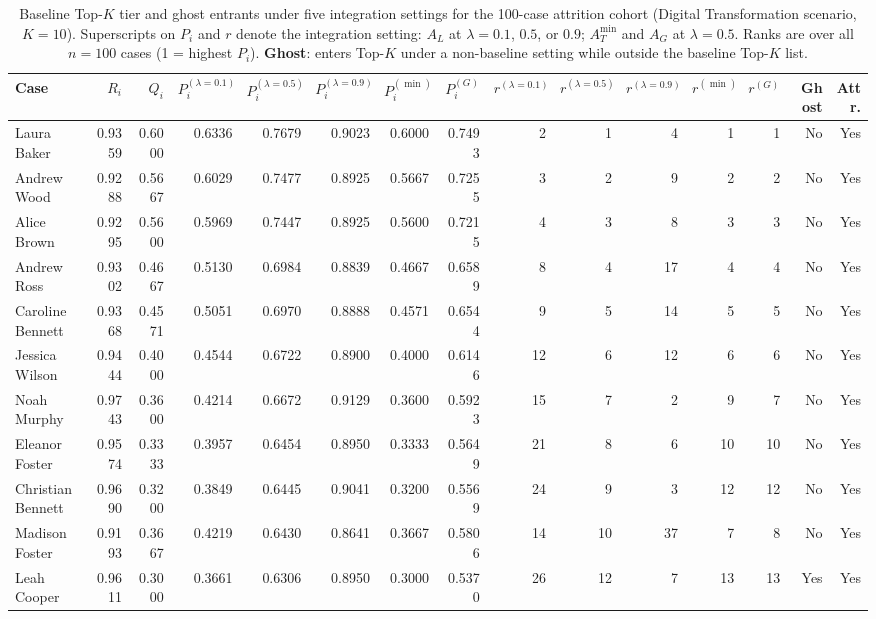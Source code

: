 \documentclass[mathematics,article,submit,moreauthors]{Definitions/mdpi}
\begin{document}
\begin{table}[t]
\centering
\scriptsize
\caption{Baseline Top-$K$ tier and ghost entrants under five integration settings for the 100-case attrition cohort (Digital Transformation scenario, $K = 10$). Superscripts on $P_i$ and $r$ denote the integration setting: $A_L$ at $\lambda = 0.1$, $0.5$, or $0.9$; $A_T^{\min}$ and $A_G$ at $\lambda = 0.5$. Ranks are over all $n = 100$ cases (1 = highest $P_i$). \textbf{Ghost}: enters Top-$K$ under a non-baseline setting while outside the baseline Top-$K$ list.}
\label{tab:real_example}
\setlength{\tabcolsep}{2pt}
\begin{tabular}{lrrrrrrrrrrrrrr}
\toprule
\textbf{Case} & $R_i$ & $Q_i$ & $P_i^{(\lambda=0.1)}$ & $P_i^{(\lambda=0.5)}$ & $P_i^{(\lambda=0.9)}$ & $P_i^{(\min)}$ & $P_i^{(G)}$ & $r^{(\lambda=0.1)}$ & $r^{(\lambda=0.5)}$ & $r^{(\lambda=0.9)}$ & $r^{(\min)}$ & $r^{(G)}$ & \textbf{Ghost} & \textbf{Attr.} \\
\midrule
Laura Baker & 0.9359 & 0.6000 & 0.6336 & 0.7679 & 0.9023 & 0.6000 & 0.7493 & 2 & 1 & 4 & 1 & 1 & No & Yes \\
Andrew Wood & 0.9288 & 0.5667 & 0.6029 & 0.7477 & 0.8925 & 0.5667 & 0.7255 & 3 & 2 & 9 & 2 & 2 & No & Yes \\
Alice Brown & 0.9295 & 0.5600 & 0.5969 & 0.7447 & 0.8925 & 0.5600 & 0.7215 & 4 & 3 & 8 & 3 & 3 & No & Yes \\
Andrew Ross & 0.9302 & 0.4667 & 0.5130 & 0.6984 & 0.8839 & 0.4667 & 0.6589 & 8 & 4 & 17 & 4 & 4 & No & Yes \\
Caroline Bennett & 0.9368 & 0.4571 & 0.5051 & 0.6970 & 0.8888 & 0.4571 & 0.6544 & 9 & 5 & 14 & 5 & 5 & No & Yes \\
Jessica Wilson & 0.9444 & 0.4000 & 0.4544 & 0.6722 & 0.8900 & 0.4000 & 0.6146 & 12 & 6 & 12 & 6 & 6 & No & Yes \\
Noah Murphy & 0.9743 & 0.3600 & 0.4214 & 0.6672 & 0.9129 & 0.3600 & 0.5923 & 15 & 7 & 2 & 9 & 7 & No & Yes \\
Eleanor Foster & 0.9574 & 0.3333 & 0.3957 & 0.6454 & 0.8950 & 0.3333 & 0.5649 & 21 & 8 & 6 & 10 & 10 & No & Yes \\
Christian Bennett & 0.9690 & 0.3200 & 0.3849 & 0.6445 & 0.9041 & 0.3200 & 0.5569 & 24 & 9 & 3 & 12 & 12 & No & Yes \\
Madison Foster & 0.9193 & 0.3667 & 0.4219 & 0.6430 & 0.8641 & 0.3667 & 0.5806 & 14 & 10 & 37 & 7 & 8 & No & Yes \\
\midrule
Leah Cooper & 0.9611 & 0.3000 & 0.3661 & 0.6306 & 0.8950 & 0.3000 & 0.5370 & 26 & 12 & 7 & 13 & 13 & Yes & Yes \\

\end{tabular}
\end{table}
\end{document}
